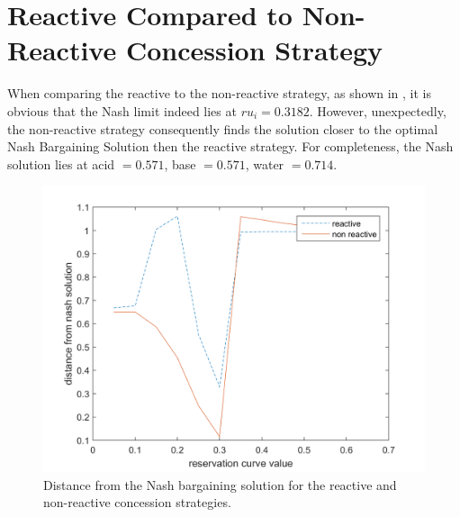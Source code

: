 \section{Reactive Compared to Non-Reactive Concession Strategy}
When comparing the reactive to the non-reactive strategy, as shown in , it is obvious that the Nash limit indeed lies at $ru_i = 0.3182$. However, unexpectedly, the non-reactive strategy consequently finds the solution closer to the optimal Nash Bargaining Solution then the reactive strategy. For completeness, the Nash solution lies at acid $= 0.571$, base $= 0.571$, water $= 0.714$.

\begin{figure}[h]
	\centering
	\includegraphics[width=0.9\linewidth]{img/reactivevsnonreactive}
	\caption{Distance from the Nash bargaining solution for the reactive and non-reactive concession strategies.}
	\label{fig:reactivevsnon-reactive}
\end{figure}

